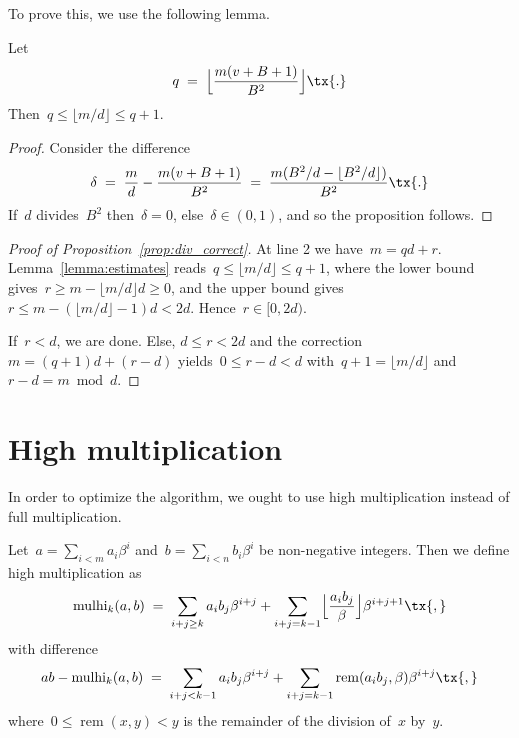 \documentclass[12pt,oneside,draft]{scrartcl}
\begin{document}
To prove this, we use the following lemma.

\begin{lemma}
\label{lemma:estimates}
Let
\begin{gather}
  q
\;=\;
  \Bigl\lfloor \frac{m (v + B + 1)}{B^{2}} \Bigr\rfloor
\tx{.}
\end{gather}
Then~$q \le \lfloor m / d \rfloor \le q + 1$.
\end{lemma}
\begin{proof}
Consider the difference
\begin{gather*}
  \delta
\;=\;
  \frac{m}{d} - \frac{m (v + B + 1)}{B^{2}}
\;=\;
  \frac{m (B^{2} / d - \lfloor B^{2} / d \rfloor)}{B^{2}}
\tx{.}
\end{gather*}
If~$d$ divides~$B^{2}$ then~$\delta = 0$, else~$\delta \in (0, 1)$, and so the proposition follows.
\end{proof}

\begin{proof}[Proof of Proposition~\ref{prop:div_correct}]
At line 2 we have~$m = q d + r$.  Lemma~\ref{lemma:estimates} reads~$q \le \lfloor m / d \rfloor \le q + 1$, where the lower bound gives~$r \ge m - \lfloor m / d \rfloor d \ge 0$, and the upper bound gives~$r \le m - (\lfloor m / d \rfloor - 1) d < 2 d$.  Hence~$r \in [0, 2 d)$.

If~$r < d$, we are done.  Else, $d \le r < 2 d$ and the correction~$m = (q + 1) d + (r - d)$ yields~$0 \le r - d < d$ with~$q + 1 = \lfloor m / d \rfloor$ and~$r - d = m \bmod d$.
\end{proof}

\section{High multiplication}
\newcommand{\mulhi}{\operatorname{mulhi}}%
\newcommand{\rem}{\operatorname{rem}}%

In order to optimize the algorithm, we ought to use high multiplication instead of full multiplication.

Let~$a = \sum_{i < m} a_{i} \beta^{i}$ and~$b = \sum_{i < n} b_{i} \beta^{i}$ be non-negative integers.  Then we define high multiplication as
\begin{gather}
  \mulhi_{k}(a, b)
\;=\;
  \sum_{i + j \ge k} a_{i} b_{j} \beta^{i + j}
  +
  \sum_{i + j = k - 1} \Bigl\lfloor \frac{a_{i} b_{j}}{\beta} \Bigr\rfloor \beta^{i + j + 1}
\tx{,}
\end{gather}
with difference
\begin{gather*}
  a b - \mulhi_{k}(a, b)
\;=\;
  \sum_{i + j < k - 1} a_{i} b_{j} \beta^{i + j}
  +
  \sum_{i + j = k - 1} \rem(a_{i} b_{j}, \beta) \beta^{i + j}
\tx{,}
\end{gather*}
where~$0 \le \rem(x, y) < y$ is the remainder of the division of~$x$ by~$y$.
\end{document}
